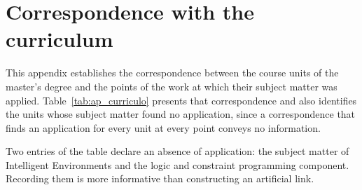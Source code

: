 \chapter{Correspondence with the curriculum}
\label{ap:curriculo}

This appendix establishes the correspondence between the course units of the master's degree and the
points of the work at which their subject matter was applied. Table~\ref{tab:ap_curriculo} presents
that correspondence and also identifies the units whose subject matter found no application, since a
correspondence that finds an application for every unit at every point conveys no information.

Two entries of the table declare an absence of application: the subject matter of Intelligent
Environments and the logic and constraint programming component. Recording them is more informative
than constructing an artificial link.

